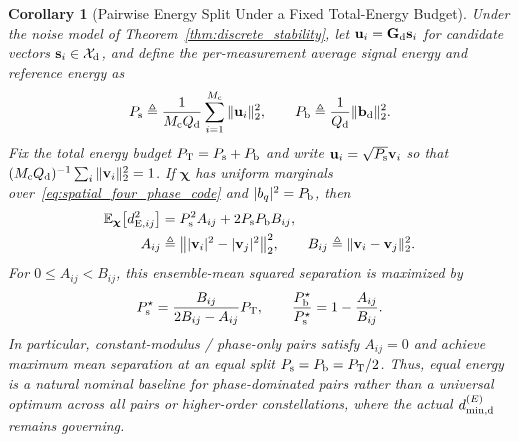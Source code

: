 \documentclass[journal]{IEEEtran}
\newtheorem{corollary}{Corollary}
\begin{document}
\begin{corollary}[Pairwise Energy Split Under a Fixed Total-Energy Budget]
\label{cor:balanced_energy_allocation}
Under the noise model of Theorem~\ref{thm:discrete_stability}, let $\mathbf{u}_i = \mathbf{G}_{\rm d}\mathbf{s}_i$ for candidate vectors $\mathbf{s}_i \in \mathcal{X}_{\rm d}$, and define the per-measurement average signal energy and reference energy as
\begin{equation}
P_{\rm s}
\triangleq \frac{1}{M_{\rm c}Q_{\rm d}}
\sum_{i=1}^{M_{\rm c}} \|\mathbf{u}_i\|_{2}^{2}, \qquad
P_{\rm b}
\triangleq \frac{1}{Q_{\rm d}} \|\mathbf{b}_{\rm d}\|_{2}^{2}.
\label{eq:average_signal_reference_energy}
\end{equation}
Fix the total energy budget $P_{\rm T} = P_{\rm s} + P_{\rm b}$ and write $\mathbf{u}_i = \sqrt{P_{\rm s}}\mathbf{v}_i$ so that $(M_{\rm c}Q_{\rm d})^{-1}\sum_i \|\mathbf{v}_i\|_{2}^{2} = 1$. If $\boldsymbol{\chi}$ has uniform marginals over~\eqref{eq:spatial_four_phase_code} and $|b_q|^{2} = P_{\rm b}$, then
\begin{equation}
\begin{aligned}
\mathbb{E}_{\boldsymbol{\chi}}\bigl[d_{{\rm E},ij}^{2}\bigr]
&= P_{\rm s}^{2}A_{ij} + 2P_{\rm s}P_{\rm b}B_{ij}, \\
A_{ij}
&\triangleq \bigl\||\mathbf{v}_i|^{2} - |\mathbf{v}_j|^{2}\bigr\|_{2}^{2}, \qquad
B_{ij}
\triangleq \|\mathbf{v}_i - \mathbf{v}_j\|_{2}^{2}.
\end{aligned}
\label{eq:pairwise_distance_energy_split}
\end{equation}
For $0 \le A_{ij} < B_{ij}$, this ensemble-mean squared separation is maximized by
\begin{equation}
P_{\rm s}^{\star}
= \frac{B_{ij}}{2B_{ij} - A_{ij}} P_{\rm T}, \qquad
\frac{P_{\rm b}^{\star}}{P_{\rm s}^{\star}}
= 1 - \frac{A_{ij}}{B_{ij}}.
\label{eq:pairwise_optimal_energy_split}
\end{equation}
In particular, constant-modulus / phase-only pairs satisfy $A_{ij} = 0$ and achieve maximum mean separation at an equal split $P_{\rm s} = P_{\rm b} = P_{\rm T}/2$. Thus, equal energy is a natural nominal baseline for phase-dominated pairs rather than a universal optimum across all pairs or higher-order constellations, where the actual $d_{\min,{\rm d}}^{(E)}$ remains governing.
\end{corollary}
\end{document}
